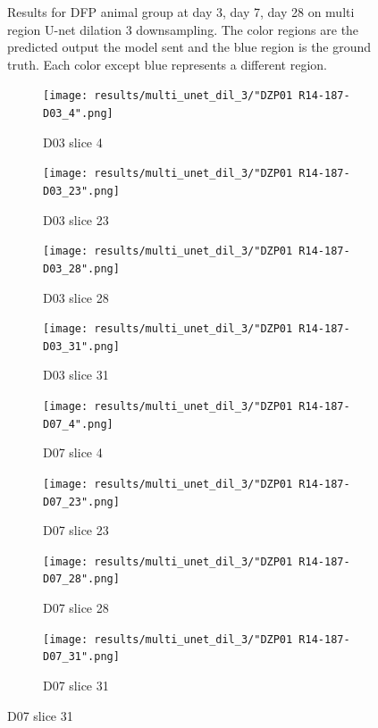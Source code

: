 \begin{figure}[!htb]
  \caption{Results for DFP animal group at day 3, day 7, day 28 on multi region U-net dilation 3 downsampling. The color regions are the predicted output the model sent and the blue region is the ground truth. Each color except blue represents a different region.}
  \label{fig:results_multi_unetdil3_DFP}
\end{figure}




\begin{figure}[!htb]  
    \centering %
\begin{subfigure}{0.25\textwidth}
  \texttt{[image: results/multi\_unet\_dil\_3/"DZP01 R14-187-D03\_4".png]}
  \caption{D03 slice 4}
\end{subfigure}\hfil %
\begin{subfigure}{0.25\textwidth}
  \texttt{[image: results/multi\_unet\_dil\_3/"DZP01 R14-187-D03\_23".png]}
  \caption{D03 slice 23}
\end{subfigure}\hfil %
\begin{subfigure}{0.25\textwidth}
  \texttt{[image: results/multi\_unet\_dil\_3/"DZP01 R14-187-D03\_28".png]}
  \caption{D03 slice 28}
\end{subfigure}\hfil %
\begin{subfigure}{0.25\textwidth}
  \texttt{[image: results/multi\_unet\_dil\_3/"DZP01 R14-187-D03\_31".png]}
  \caption{D03 slice 31}
\end{subfigure}

\medskip
\begin{subfigure}{0.25\textwidth}
  \texttt{[image: results/multi\_unet\_dil\_3/"DZP01 R14-187-D07\_4".png]}
  \caption{D07 slice 4}
\end{subfigure}\hfil %
\begin{subfigure}{0.25\textwidth}
  \texttt{[image: results/multi\_unet\_dil\_3/"DZP01 R14-187-D07\_23".png]}
  \caption{D07 slice 23}
\end{subfigure}\hfil %
\begin{subfigure}{0.25\textwidth}
  \texttt{[image: results/multi\_unet\_dil\_3/"DZP01 R14-187-D07\_28".png]}
  \caption{D07 slice 28}
\end{subfigure}\hfil %
\begin{subfigure}{0.25\textwidth}
  \texttt{[image: results/multi\_unet\_dil\_3/"DZP01 R14-187-D07\_31".png]}
  \caption{D07 slice 31}
\end{subfigure}


\end{figure}

